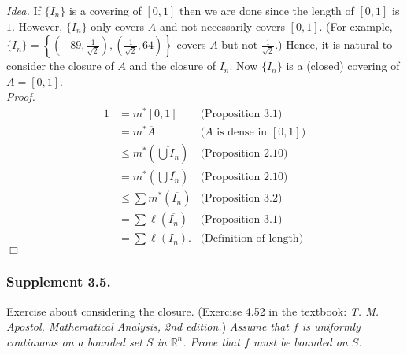 \documentclass{article}
\begin{document}
\emph{Idea.}
If $\{ I_n\}$ is a covering of $[0, 1]$ then we are done
since the length of $[0, 1]$ is $1$.
However, $\{ I_n\}$ only covers $A$ and not necessarily covers $[0, 1]$.
(For example,
$\{ I_n \}
= \left\{
\left( -89, \frac{1}{\sqrt{2}} \right),
\left( \frac{1}{\sqrt{2}}, 64 \right)
\right\}$ covers $A$ but not $\frac{1}{\sqrt{2}}$.)
Hence, it is natural to consider the closure of $A$ and
the closure of $I_n$.
Now $\{ \overline{I_n} \}$ is a (closed) covering of
$\overline{A} = [0, 1]$. \\



\emph{Proof.}
\begin{align*}
  1
  &= m^{*}[0, 1]
    &\text{(Proposition 3.1)} \\
  &= m^{*}\overline{A}
    &\text{($A$ is dense in $[0, 1]$)} \\
  &\leq m^{*}\left( \overline{\bigcup I_n} \right)
    &\text{(Proposition 2.10)} \\
  &= m^{*}\left( \bigcup \overline{I_n} \right)
    &\text{(Proposition 2.10)} \\
  &\leq \sum m^{*}(\overline{I_n})
    &\text{(Proposition 3.2)} \\
  &= \sum \ell(\overline{I_n})
    &\text{(Proposition 3.1)} \\
  &= \sum \ell(I_n).
    &\text{(Definition of length)}
  \end{align*}
$\Box$ \\



\subsubsection*{Supplement 3.5.}
Exercise about considering the closure.
(Exercise 4.52  in the textbook: \emph{T. M. Apostol, Mathematical Analysis, 2nd edition.})
\emph{Assume that $f$ is uniformly continuous on a bounded set $S$ in $\mathbb{R}^n$.
Prove that $f$ must be bounded on $S$.} \\
\end{document}
